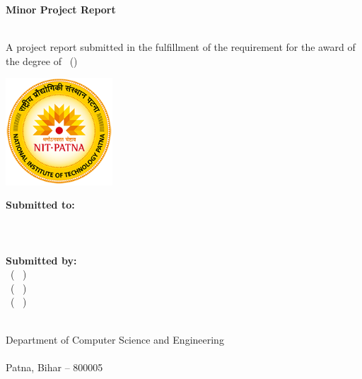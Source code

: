 
\begin{titlepage}
	\begin{center}
 
 		\textbf{\Huge{Minor Project Report} \vspace{1cm}\\\huge\projectname} \\
		\vspace{1cm}
		
		 A project report submitted in the fulfillment of the requirement for the award of the degree of \course\ (\courseShort)
		\vspace{2cm}

        \includegraphics[width=0.3\textwidth]{figures/college_logo.png}
        \vspace{2cm}

        
		\textbf{\Large Submitted to:} \\
		\textbf{\large \guidename} \\
        \textbf{\guideDesignation} \\
        \textbf{\collegefullname} \\
        \vspace{2cm}
		\textbf{\Large Submitted by:} \\
		\textbf{\large \cMembOne} \ (
            \textbf{\cMembOneRoll} \ ) \\
            \textbf{\large \cMembTwo} \ (
            \textbf{\cMembTwoRoll} \ ) \\
            \textbf{\large \cMembThree}\ (
            \textbf{\cMembThreeRoll} \ )\\
		
		\vspace{2cm}

		
        \course \\
        Department of Computer Science and Engineering \\
        \collegefullname \\
        Patna, Bihar – 800005 
	\end{center}
\end{titlepage}